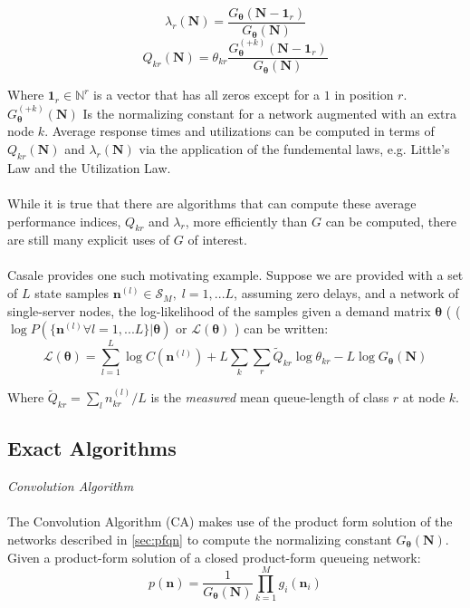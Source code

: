 \begin{equation}
    \lambda_r(\mathbf{N}) = \frac{G_{\boldsymbol{\theta}}(\mathbf{N} - \mathbf{1}_r)}{G_{\boldsymbol{\theta}}(\mathbf{N})}
\end{equation}
\begin{equation}
    Q_{kr}(\mathbf{N}) = \theta_{kr} \frac{G^{(+k)}_{\boldsymbol{\theta}}(\mathbf{N} - \mathbf{1}_r)}{G_{\boldsymbol{\theta}}(\mathbf{N})}
\end{equation}

Where \(\mathbf{1}_r \in \mathbb{N}^r\) is a vector that has all zeros except for a \(1\) in position \(r\). \(G^{(+k)}_{\boldsymbol{\theta}}(\mathbf{N})\) Is the normalizing constant for a network augmented with an extra node \(k\). Average response times and utilizations can be computed in terms of \(Q_{kr}(\mathbf{N})\) and \(\lambda_r(\mathbf{N})\) via the application of the fundemental laws, e.g. Little's Law and the Utilization Law.
\\\\
While it is true that there are algorithms \cite{Reiser1975QueuingAlgorithms, Chow1983ApproximationsNetworks, Chandy1982Linearizer:Systems, Sevcik2002SolutionAlgorithm} that can compute these average performance indices, \(Q_{kr}\) and \(\lambda_r\), more efficiently than \(G\) can be computed, there are still many explicit uses of \(G\) of interest. 
\\\\
Casale \cite{Casale2017AcceleratingMethods} provides one such motivating example. Suppose we are provided with a set of \(L\) state samples \(\mathbf{n}^{(l)} \in \mathcal{S}_M, \; l=1,...L\), assuming zero delays, and a network of single-server nodes, the log-likelihood of the samples given a demand matrix \(\boldsymbol{\theta}\) ( (\(\log P(\{\mathbf{n}^{(l)} \forall l=1,...L \} | \boldsymbol{\theta})\) or \(\mathcal{L}(\boldsymbol{\theta})\) ) can be written:
\[\mathcal{L}(\boldsymbol{\theta}) = \sum_{l=1}^L \log C(\mathbf{n}^{(l)}) + L \sum_{k} \sum_{r} \widetilde{Q}_{kr} \log \theta_{kr} - L \log G_{\boldsymbol{\theta}}(\mathbf{N})\]

Where \(\widetilde{Q}_{kr} = \sum_{l} n_{kr}^{(l)}/L\) is the \textit{measured} mean queue-length of class \(r\) at node \(k\).

\subsection{Exact Algorithms}\label{sec:exact_algos}
\textit{{\large Convolution Algorithm}}\\\\
The Convolution Algorithm (CA) makes use of the product form solution of the networks described in \ref{sec:pfqn} to compute the normalizing constant \(G_{\boldsymbol{\theta}}(\mathbf{N})\). Given a product-form solution of a closed product-form queueing network:
\begin{equation}
    p(\mathbf{n}) = \frac{1}{G_{\boldsymbol{\theta}}(\mathbf{N})} \prod_{k=1}^M g_i(\mathbf{n}_i)
\end{equation}


